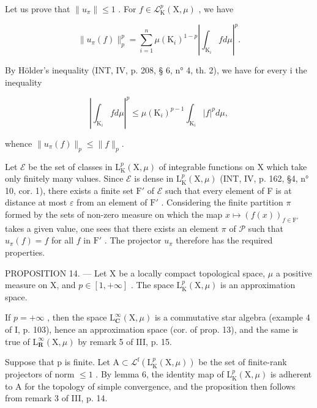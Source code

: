 Let us prove that \(\| u_{\pi}\| \leqslant 1\) . For \(f\in \mathcal{L}_{\mathrm{K}}^{p}(\mathrm{X},\mu)\) , we have

\[
\| u _ {\pi} (f) \| _ {p} ^ {p} = \sum_ {i = 1} ^ {n} \mu (\mathrm{K} _ {i}) ^ {1 - p} \left| \int_ {\mathrm{K} _ {i}} f d \mu \right| ^ {p}.
\]

By Hölder's inequality (INT, IV, p. 208, § 6, n° 4, th. 2), we have for every i the inequality

\[
\left| \int_ {\mathrm{K} _ {i}} f d \mu \right| ^ {p} \leqslant \mu (\mathrm{K} _ {i}) ^ {p - 1} \int_ {\mathrm{K} _ {i}} | f | ^ {p} d \mu ,
\]

whence \(\| u_{\pi}(f)\| _p\leqslant \| f\| _p.\)

Let \(\mathcal{E}\) be the set of classes in \(\mathrm{L}_{\mathrm{K}}^{p}(\mathrm{X},\mu)\) of integrable functions on X which take only finitely many values. Since \(\mathcal{E}\) is dense in \(\mathrm{L}_{\mathrm{K}}^{p}(\mathrm{X},\mu)\) (INT, IV, p. 162, §4, n° 10, cor. 1), there exists a finite set \(\mathrm{F}'\) of \(\mathcal{E}\) such that every element of F is at distance at most \(\varepsilon\) from an element of \(\mathrm{F}'\) . Considering the finite partition \(\pi\) formed by the sets of non-zero measure on which the map \(x\mapsto (f(x))_{f\in \mathrm{F}'}\) takes a given value, one sees that there exists an element \(\pi\) of \(\mathcal{P}\) such that \(u_{\pi}(f) = f\) for all \(f\) in \(\mathrm{F}'\) . The projector \(u_{\pi}\) therefore has the required properties.

PROPOSITION 14. --- Let X be a locally compact topological space, \(\mu\) a positive measure on X, and \(p \in [1, +\infty]\) . The space \(\mathrm{L}_{\mathrm{K}}^{p}(\mathrm{X}, \mu)\) is an approximation space.

If \(p = +\infty\) , then the space \(\mathrm{L}_{\mathbf{C}}^{\infty}(\mathrm{X},\mu)\) is a commutative star algebra (example 4 of I, p. 103), hence an approximation space (cor. of prop. 13), and the same is true of \(\mathrm{L}_{\mathbf{R}}^{\infty}(\mathrm{X},\mu)\) by remark 5 of III, p. 15.

Suppose that p is finite. Let \(\mathrm{A}\subset\mathcal{L}^{\mathrm{f}}(\mathrm{L}_{\mathrm{K}}^{p}(\mathrm{X},\mu))\) be the set of finite-rank projectors of norm \(\leqslant1\) . By lemma 6, the identity map of \(\mathrm{L}_{\mathrm{K}}^{p}(\mathrm{X},\mu)\) is adherent to A for the topology of simple convergence, and the proposition then follows from remark 3 of III, p. 14.

